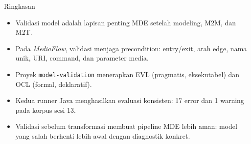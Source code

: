 \documentclass[aspectratio=169, table]{beamer}
\begin{document}
\begin{frame}{Ringkasan}
\vspace{6pt}
\begin{itemize}
  \item Validasi model adalah lapisan penting MDE setelah modeling, M2M, dan M2T.
  \item Pada \textit{MediaFlow}, validasi menjaga precondition: entry/exit, arah edge, nama unik, URI, command, dan parameter media.
  \item Proyek \texttt{model-validation} menerapkan EVL (pragmatis, eksekutabel) dan OCL (formal, deklaratif).
  \item Kedua runner Java menghasilkan evaluasi konsisten: 17 error dan 1 warning pada korpus sesi 13.
  \item Validasi sebelum transformasi membuat pipeline MDE lebih aman: model yang salah berhenti lebih awal dengan diagnostik konkret.
\end{itemize}
\end{frame}
\end{document}
